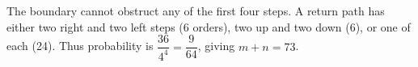 The boundary cannot obstruct any of the first four steps. A return path has either two right and two left steps (6 orders), two up and two down (6), or one of each (24). Thus probability is $\dfrac{36}{4^4}=\dfrac{9}{64}$, giving $\boxed{m+n=73}$.

